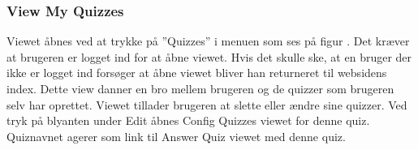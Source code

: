 \subsubsection{View My Quizzes}
Viewet åbnes ved at trykke på ''Quizzes'' i menuen som ses på figur . Det kræver at brugeren er logget ind for at åbne viewet. Hvis det skulle ske, at en bruger der ikke er logget ind forsøger at åbne viewet bliver han returneret til websidens index.
Dette view danner en bro mellem brugeren og de quizzer som brugeren selv har oprettet. Viewet tillader brugeren at slette eller ændre sine quizzer. Ved tryk på blyanten under Edit åbnes Config Quizzes viewet for denne quiz. Quiznavnet agerer som link til Answer Quiz viewet med denne quiz. 